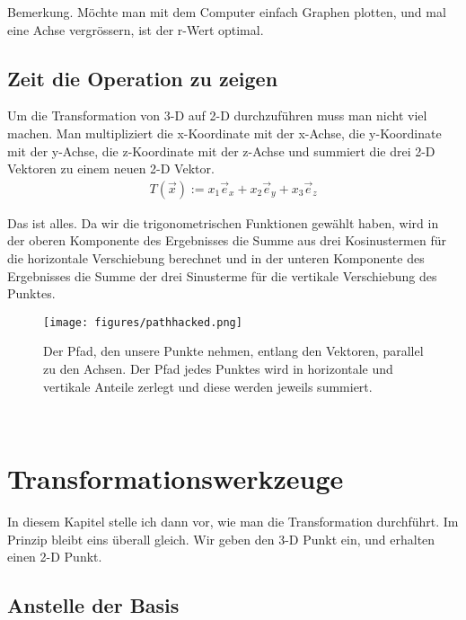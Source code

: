 \documentclass[a4paper]{article}
\begin{document}
Bemerkung. M\"ochte man mit dem Computer einfach Graphen plotten, und mal eine Achse vergr\"ossern, ist der r-Wert optimal.\\


\subsection{Zeit die Operation zu zeigen}


Um die Transformation von 3-D auf 2-D durchzuf\"uhren muss man nicht viel machen. Man multipliziert die x-Koordinate mit der x-Achse,
die y-Koordinate mit der y-Achse, die z-Koordinate mit der z-Achse und summiert die drei 2-D Vektoren zu einem neuen 2-D Vektor.\\

\begin{displaymath}
\begin{align}
    T(\vec{x}) := x_1 \vec{e}_x + x_2 \vec{e}_y + x_3 \vec{e}_z
\end{align}
\end{displaymath}

Das ist alles. Da wir die trigonometrischen Funktionen gew\"ahlt haben, wird in der oberen Komponente des Ergebnisses die Summe aus drei Kosinustermen f\"ur die horizontale Verschiebung berechnet und in der unteren Komponente des Ergebnisses die Summe der drei Sinusterme f\"ur die vertikale Verschiebung des Punktes. 


\begin{figure}[ht]
\texttt{[image: figures/pathhacked.png]}
\caption{Der Pfad, den unsere Punkte nehmen, entlang den Vektoren, parallel zu den Achsen. Der Pfad jedes Punktes wird in horizontale und vertikale Anteile zerlegt und diese werden jeweils summiert.}
\end{figure}\\

\section{Transformationswerkzeuge}

In diesem Kapitel stelle ich dann vor, wie man die Transformation durchf\"uhrt. Im Prinzip bleibt eins \"uberall gleich. Wir geben den 3-D Punkt ein, und erhalten einen 2-D Punkt.\\

\subsection{Anstelle der Basis}
\end{document}
